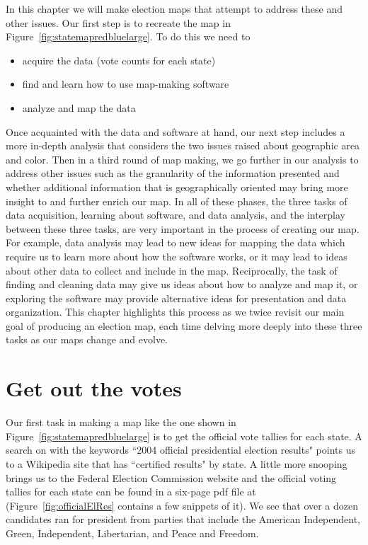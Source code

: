 In this chapter we will make election maps that attempt to address these
and other issues. Our first step is to recreate the 
map in Figure~\ref{fig:statemapredbluelarge}.
To do this we need to 
\begin{itemize}
\item acquire the data (vote counts for each state)
\item find and learn how to use map-making software 
\item analyze and map the data
\end{itemize}
Once acquainted with the data and software at hand,
our next step includes a more in-depth analysis that considers
the two issues raised about geographic area and color.
Then in a third round of map making, we go further in our analysis to address
other issues such as the granularity of the information presented 
and whether additional information that is geographically oriented may 
bring more insight to and further enrich our map.
In all of these phases, the three tasks of data acquisition,
learning about software, and data analysis, and the interplay
between these three tasks, are very important  in the process
of creating our map.
For example, data analysis may lead to new ideas for mapping
the data which require us to learn more about how the software
works, or it may lead to ideas about other data to collect
and include in the map.  Reciprocally, the task of
finding and cleaning data may give us ideas about how to analyze and
map it, or exploring the software may provide alternative ideas for
presentation and data organization.
This chapter highlights this process as we twice revisit our 
main goal of producing an election map, each time delving more
deeply into these three tasks as our maps change and evolve.


\section{Get out the votes}

Our first task in making a map like the one shown in 
Figure~\ref{fig:statemapredbluelarge}
is to get the official vote tallies for each state.
A search on  with the keywords
``2004 official presidential election results" points us to
a Wikipedia site that has ``certified results" by state.
A little more snooping brings us 
to the Federal Election Commission website
and the official voting tallies for
each state can be found in a six-page pdf file 
at 
(Figure~\ref{fig:officialElRes} contains a few snippets of it).
We see that over a dozen candidates ran for president from
parties that include the American Independent, Green,
Independent, Libertarian, and Peace and Freedom.

